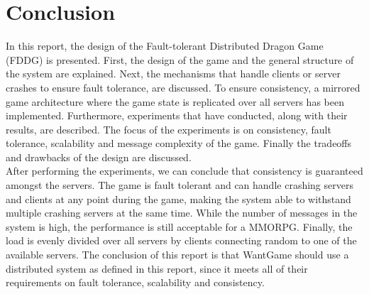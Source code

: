 \section{Conclusion}
In this report, the design of the Fault-tolerant Distributed Dragon Game (FDDG) is presented. First, the design of the game and the general structure of the system are explained. Next, the mechanisms that handle clients or server crashes to ensure fault tolerance, are discussed. To ensure consistency, a mirrored game architecture where the game state is replicated over all servers has been implemented. Furthermore, experiments that have conducted, along with their results, are described. The focus of the experiments is on consistency, fault tolerance, scalability and message complexity of the game. Finally the tradeoffs and drawbacks of the design are discussed.\\
After performing the experiments, we can conclude that consistency is guaranteed amongst the servers. The game is fault tolerant and can handle crashing servers and clients at any point during the game, making the system able to withstand multiple crashing servers at the same time. While the number of messages in the system is high, the performance is still acceptable for a MMORPG. Finally, the load is evenly divided over all servers by clients connecting random to one of the available servers.
The conclusion of this report is that WantGame should use a distributed system as defined in this report, since it meets all of their requirements on fault tolerance, scalability and consistency.